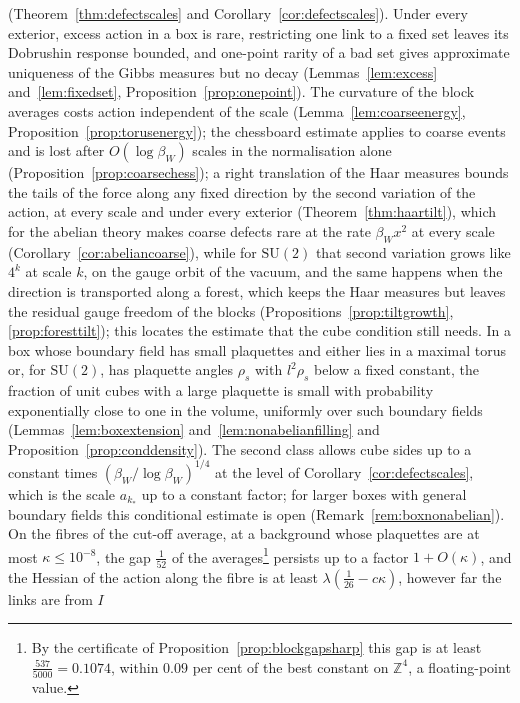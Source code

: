 \documentclass[11pt]{amsart}
\theoremstyle{definition}
\theoremstyle{remark}
\numberwithin{equation}{section}
\newcommand{\Z}{\mathbb{Z}}
\newcommand{\SU}{\mathrm{SU}}
\begin{document}
(Theorem~\ref{thm:defectscales} and Corollary~\ref{cor:defectscales}).
Under every exterior, excess action in a box is rare, restricting one link
to a fixed set leaves its Dobrushin response bounded, and one-point rarity
of a bad set gives approximate uniqueness of the Gibbs measures but no
decay (Lemmas~\ref{lem:excess} and~\ref{lem:fixedset},
Proposition~\ref{prop:onepoint}). The curvature of the block averages
costs action independent of the scale (Lemma~\ref{lem:coarseenergy},
Proposition~\ref{prop:torusenergy}); the chessboard estimate applies to
coarse events and is lost after $O(\log\beta_W)$ scales in the
normalisation alone (Proposition~\ref{prop:coarsechess}); a right
translation of the Haar measures bounds the tails of the force along any
fixed direction by the second variation of the action, at every scale and
under every exterior (Theorem~\ref{thm:haartilt}), which for the abelian
theory makes coarse defects rare at the rate $\beta_Wx^2$ at every scale
(Corollary~\ref{cor:abeliancoarse}), while for $\SU(2)$ that second
variation grows like $4^k$ at scale $k$, on the gauge orbit of the vacuum,
and the same happens when the direction is transported along a forest,
which keeps the Haar measures but leaves the residual gauge freedom of the
blocks (Propositions~\ref{prop:tiltgrowth}, \ref{prop:foresttilt}); this
locates the estimate that the cube condition still needs.
In a box whose boundary field has small plaquettes and either lies in a
maximal torus or, for $\SU(2)$, has plaquette angles $\rho_s$ with
$l^2\rho_s$ below a fixed constant, the fraction of unit cubes with a large
plaquette is small with probability exponentially close to one in the
volume, uniformly over such boundary fields
(Lemmas~\ref{lem:boxextension} and~\ref{lem:nonabelianfilling} and
Proposition~\ref{prop:conddensity}). The second class allows cube sides up
to a constant times $(\beta_W/\log\beta_W)^{1/4}$ at the level of
Corollary~\ref{cor:defectscales}, which is the scale $a_{k_*}$ up to a
constant factor; for larger boxes with general boundary fields this
conditional estimate is open (Remark~\ref{rem:boxnonabelian}).
On the fibres of the cut-off average, at a background whose plaquettes are
at most $\kappa\le10^{-8}$, the gap $\frac1{52}$ of the averages\footnote{By the certificate of
Proposition~\ref{prop:blockgapsharp} this gap is at least
$\frac{537}{5000}=0.1074$, within $0.09$ per cent of the best constant on $\Z^4$, a
floating-point value.}
persists up
to a factor $1+O(\kappa)$, and the Hessian of the action along the fibre is
at least $\lambda(\frac1{26}-c\kappa)$, however far the links are from $I$
\end{document}
